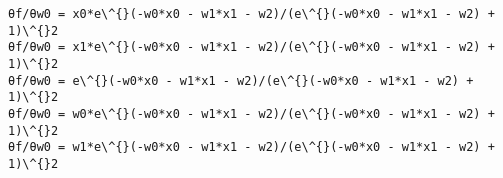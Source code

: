 \documentclass[11pt]{article}
\makeatletter
\newcommand{\boxspacing}{\kern\kvtcb@left@rule\kern\kvtcb@boxsep}
\newcommand{\prompt}[4]{
        {\ttfamily\llap{{\color{#2}[#3]:\hspace{3pt}#4}}\vspace{-\baselineskip}}
    }
\makeatother
\begin{document}
    \begin{Verbatim}[commandchars=\\\{\}]
θf/θw0 = x0*e\^{}(-w0*x0 - w1*x1 - w2)/(e\^{}(-w0*x0 - w1*x1 - w2) + 1)\^{}2
θf/θw0 = x1*e\^{}(-w0*x0 - w1*x1 - w2)/(e\^{}(-w0*x0 - w1*x1 - w2) + 1)\^{}2
θf/θw0 = e\^{}(-w0*x0 - w1*x1 - w2)/(e\^{}(-w0*x0 - w1*x1 - w2) + 1)\^{}2
θf/θw0 = w0*e\^{}(-w0*x0 - w1*x1 - w2)/(e\^{}(-w0*x0 - w1*x1 - w2) + 1)\^{}2
θf/θw0 = w1*e\^{}(-w0*x0 - w1*x1 - w2)/(e\^{}(-w0*x0 - w1*x1 - w2) + 1)\^{}2
    \end{Verbatim}

    \begin{tcolorbox}[breakable, size=fbox, boxrule=1pt, pad at break*=1mm,colback=cellbackground, colframe=cellborder]
\prompt{In}{incolor}{ }{\boxspacing}
\begin{Verbatim}[commandchars=\\\{\}]

\end{Verbatim}
\end{tcolorbox}
\end{document}
